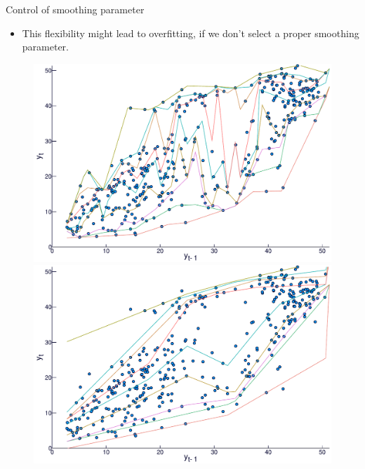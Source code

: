 \documentclass[11pt]{beamer}
\begin{document}
\begin{frame}{Control of smoothing parameter}

\begin{itemize}

\item
This flexibility might lead to overfitting, if we don't select a
proper smoothing parameter.
\end{itemize}

\begin{figure}
\centering
\begin{minipage}[t]{\linewidth}
\centering
\begin{minipage}[t]{0.45\linewidth}
\centering     \includegraphics[width=\textwidth]{Images/icaraizinho-crossing-01}
\end{minipage}
\begin{minipage}[t]{0.45\linewidth}
\centering     \includegraphics[width=\textwidth]{Images/icaraizinho-crossing-3}
\end{minipage}
\end{minipage}
\end{figure}

\end{frame}
\end{document}
